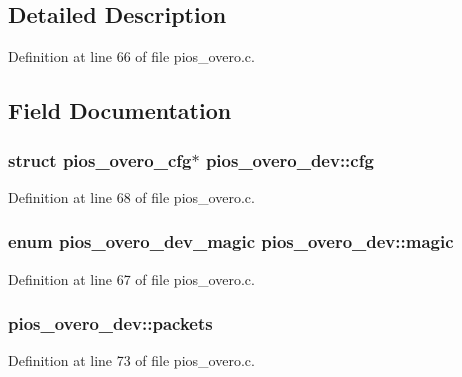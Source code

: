 \subsection{Detailed Description}


Definition at line 66 of file pios\-\_\-overo.\-c.



\subsection{Field Documentation}
\hypertarget{structpios__overo__dev_a8bb10a548957bcd5da841fcd655b14d2}{
\subsubsection[{cfg}]{\setlength{\rightskip}{0pt plus 5cm}struct {\bf pios\-\_\-overo\-\_\-cfg}$\ast$ pios\-\_\-overo\-\_\-dev\-::cfg}}\label{structpios__overo__dev_a8bb10a548957bcd5da841fcd655b14d2}


Definition at line 68 of file pios\-\_\-overo.\-c.

\hypertarget{structpios__overo__dev_a6d9be49c3c20b721ac63620ce90d30ae}{
\subsubsection[{magic}]{\setlength{\rightskip}{0pt plus 5cm}enum {\bf pios\-\_\-overo\-\_\-dev\-\_\-magic} pios\-\_\-overo\-\_\-dev\-::magic}}\label{structpios__overo__dev_a6d9be49c3c20b721ac63620ce90d30ae}


Definition at line 67 of file pios\-\_\-overo.\-c.

\hypertarget{structpios__overo__dev_ad0b4a0ccb4fb05b14cc21805b5dbe9b9}{
\subsubsection[{packets}]{ pios\-\_\-overo\-\_\-dev\-::packets}}\label{structpios__overo__dev_ad0b4a0ccb4fb05b14cc21805b5dbe9b9}


Definition at line 73 of file pios\-\_\-overo.\-c.

